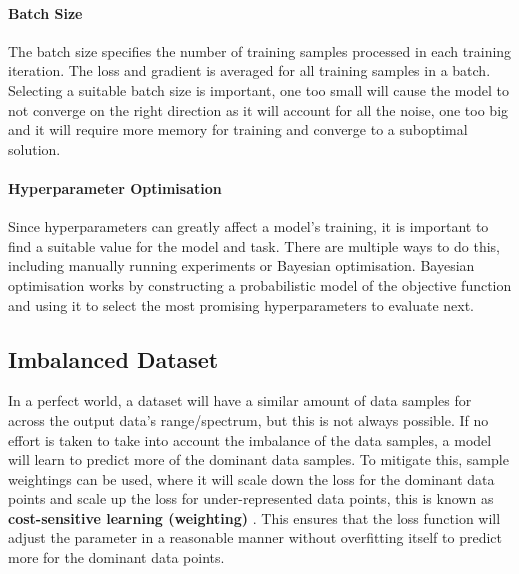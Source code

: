 \paragraph{Batch Size} \label{ML:BatchSize} The batch size specifies the number of training samples processed in each training iteration. The loss and gradient is averaged for all training samples in a batch. Selecting a suitable batch size is important, one too small will cause the model to not converge on the right direction as it will account for all the noise, one too big and it will require more memory for training and converge to a suboptimal solution.


\paragraph{Hyperparameter Optimisation} Since hyperparameters can greatly affect a model's training, it is important to find a suitable value for the model and task. There are multiple ways to do this, including manually running experiments or Bayesian optimisation. Bayesian optimisation works by constructing a probabilistic model of the objective function and using it to select the most promising hyperparameters to evaluate next. 

\subsection{Imbalanced Dataset}
In a perfect world, a dataset will have a similar amount of data samples for across the output data's range/spectrum, but this is not always possible. If no effort is taken to take into account the imbalance of the data samples, a model will learn to predict more of the dominant data samples. To mitigate this, sample weightings can be used, where it will scale down the loss for the dominant data points and scale up the loss for under-represented data points, this is known as \textbf{cost-sensitive learning (weighting)} \cite{ImbalancedDataset}. This ensures that the loss function will adjust the parameter in a reasonable manner without overfitting itself to predict more for the dominant data points.


